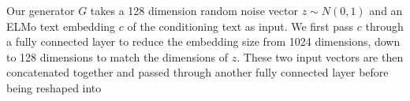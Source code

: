 Our generator $G$ takes a 128 dimension random noise vector $z \sim N(0, 1)$ and an ELMo text embedding $c$ of the conditioning text as input. We first pass $c$ through a fully connected layer to reduce the embedding size from 1024 dimensions, down to 128 dimensions to match the dimensions of $z$. These two input vectors are then concatenated together and passed through another fully connected layer before being reshaped into 
